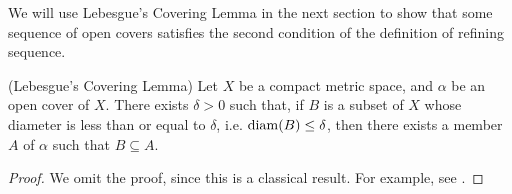 \documentclass[12pt,twoside,draft]{book}
\begin{document}
We will use Lebesgue's Covering Lemma in the next section to show that some sequence of open covers satisfies the second condition of the definition of refining sequence.
\begin{lemma}
  (Lebesgue's Covering Lemma)
  Let $X$ be a compact metric space, and $\alpha$ be an open cover of $X$.
  There exists $\delta > 0$ such that, if $B$ is a subset of $X$ whose diameter is less than or equal to $\delta$, i.e. $\mathrm{diam}(B) \leq \delta$, then there exists a member $A$ of $\alpha$ such that $B \subseteq A$.
  \label{lem:covering}
  \begin{proof}
    We omit the proof, since this is a classical result.
    For example, see \citet{royden}.
  \end{proof}
\end{lemma}
\end{document}
